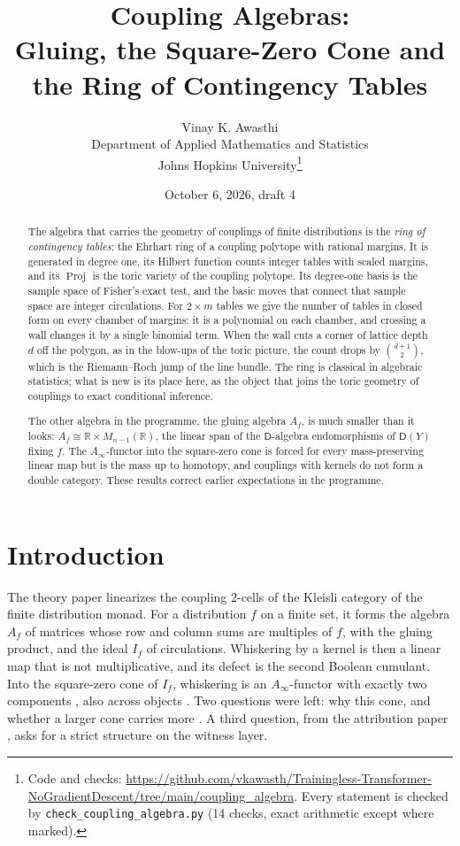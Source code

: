 \documentclass[11pt]{article}
\title{Coupling Algebras:\\
Gluing, the Square-Zero Cone and the Ring of Contingency Tables}
\author{Vinay K. Awasthi\\
Department of Applied Mathematics and Statistics\\
Johns Hopkins University\thanks{Code and checks: \url{https://github.com/vkawasth/Trainingless-Transformer-NoGradientDescent/tree/main/coupling_algebra}. Every statement is checked by \texttt{check\_coupling\_algebra.py} (14 checks, exact
arithmetic except where marked).}}
\date{October 6, 2026, draft 4}
\theoremstyle{definition}
\theoremstyle{remark}
\newcommand{\D}{\mathsf{D}}
\newcommand{\R}{\mathbb{R}}
\begin{document}
\maketitle

\begin{abstract}
The algebra that carries the geometry of couplings of finite distributions is the \emph{ring of contingency tables}:
the Ehrhart ring of a coupling polytope with rational margins. It is generated in degree one, its Hilbert function counts
integer tables with scaled margins, and its $\operatorname{Proj}$ is the toric variety of the coupling polytope. Its degree-one
basis is the sample space of Fisher's exact test, and the basic moves that connect that sample space are integer
circulations. For $2\times m$ tables we give the number of tables in closed form on every chamber of margins: it is a
polynomial on each chamber, and crossing a wall changes it by a single binomial term. When the wall cuts a corner of
lattice depth $d$ off the polygon, as in the blow-ups of the toric picture, the count drops by $\binom{d+1}2$, which is the
Riemann--Roch jump of the line bundle. The ring is classical in algebraic statistics; what is new is its place here, as the
object that joins the toric geometry of couplings to exact conditional inference.

The other algebra in the programme, the gluing algebra $A_f$, is much smaller than it looks: $A_f\cong\R\times M_{n-1}(\R)$, the
linear span of the $\D$-algebra endomorphisms of $\D(Y)$ fixing $f$. The $A_\infty$-functor into the square-zero cone is forced
for every mass-preserving linear map but is the mass up to homotopy, and couplings with kernels do not form a double
category. These results correct earlier expectations in the programme.
\end{abstract}

\tableofcontents

\section{Introduction}\label{sec:intro}

The theory paper \cite{Conditionals} linearizes the coupling 2-cells of the Kleisli category of the finite distribution
monad. For a distribution $f$ on a finite set, it forms the algebra $A_f$ of matrices whose row and column sums are
multiples of $f$, with the gluing product, and the ideal $I_f$ of circulations. Whiskering by a kernel is then a linear
map that is not multiplicative, and its defect is the second Boolean cumulant. Into the square-zero cone of $I_f$,
whiskering is an $A_\infty$-functor with exactly two components \cite[Thm.~5.2]{Conditionals}, also across objects
\cite[Thm.~10.2]{Conditionals}. Two questions were left: why this cone, and whether a larger cone carries more
\cite[Question~9.4]{Conditionals}. A third question, from the attribution paper \cite[Open problem~5]{Attribution}, asks
for a strict structure on the witness layer.
\end{document}
